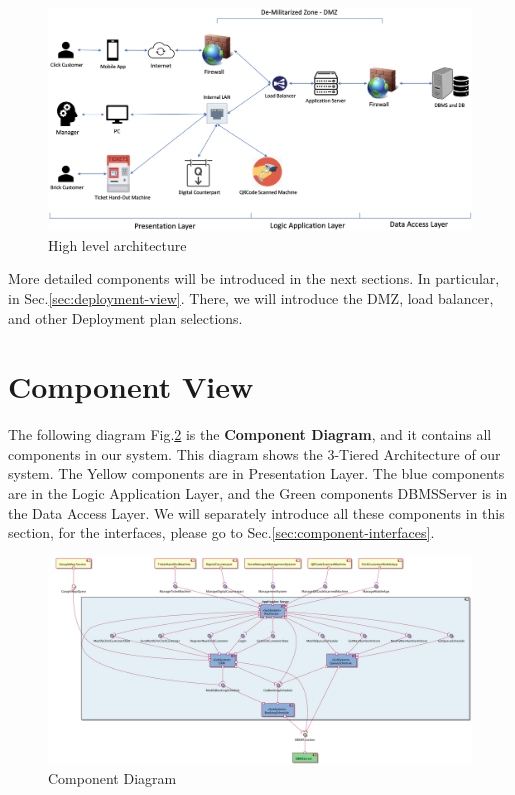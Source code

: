 \documentclass[a4paper,12pt]{report}
\begin{document}
\begin{figure}[H]
	\centering
	\includegraphics[width=1.2\textwidth]{HighLevelArchitecture}
	\caption{High level architecture}
	\centering
	\label{fig:HighLevelArchitecture}
\end{figure}

More detailed components will be introduced in the next sections.
In particular, in Sec.\ref{sec:deployment-view}.
There, we will introduce the DMZ, load balancer, and other Deployment plan selections.


\section{Component View} \label{sec:ComponentView}
The following diagram Fig.\ref{fig:ComponentDiagram} is the \textbf{Component Diagram}, and it contains all components in our system.
This diagram shows the 3-Tiered Architecture of our system.
The Yellow components are in Presentation Layer.
The blue components are in the Logic Application Layer, and the Green components DBMSServer is in the Data Access Layer.
We will separately introduce all these components in this section, for the interfaces, please go to Sec.\ref{sec:component-interfaces}.

\begin{figure}[H]
	\includegraphics[width=1.2\textwidth]{component_diagram}
	\centering
	\caption{Component Diagram}
	\label{fig:ComponentDiagram}
\end{figure}
\end{document}

